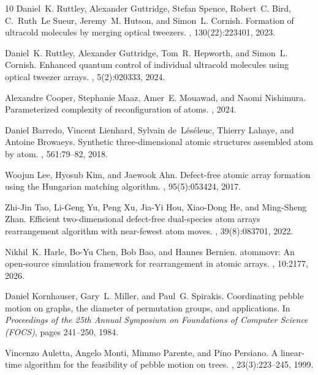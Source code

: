 \documentclass[a4paper,USenglish,thm-restate]{lipics-v2021}
\theoremstyle{problemstyle}
\begin{document}
\begin{thebibliography}{10}
Daniel~K. Ruttley, Alexander Guttridge, Stefan Spence, Robert~C. Bird,
  C.~Ruth~Le Sueur, Jeremy~M. Hutson, and Simon~L. Cornish.
\newblock Formation of ultracold molecules by merging optical tweezers.
, 130(22):223401, 2023.

Daniel~K. Ruttley, Alexander Guttridge, Tom~R. Hepworth, and Simon~L. Cornish.
\newblock Enhanced quantum control of individual ultracold molecules using
  optical tweezer arrays.
, 5(2):020333, 2024.

Alexandre Cooper, Stephanie Maaz, Amer~E. Mouawad, and Naomi Nishimura.
\newblock Parameterized complexity of reconfiguration of atoms.
, 2024.

Daniel Barredo, Vincent Lienhard, Sylvain de~L{\'e}s{\'e}leuc, Thierry Lahaye,
  and Antoine Browaeys.
\newblock Synthetic three-dimensional atomic structures assembled atom by atom.
, 561:79--82, 2018.

Woojun Lee, Hyosub Kim, and Jaewook Ahn.
\newblock Defect-free atomic array formation using the {Hungarian} matching
  algorithm.
, 95(5):053424, 2017.

Zhi-Jin Tao, Li-Geng Yu, Peng Xu, Jia-Yi Hou, Xiao-Dong He, and Ming-Sheng
  Zhan.
\newblock Efficient two-dimensional defect-free dual-species atom arrays
  rearrangement algorithm with near-fewest atom moves.
, 39(8):083701, 2022.

Nikhil~K. Harle, Bo-Yu Chen, Bob Bao, and Hannes Bernien.
\newblock atommovr: An open-source simulation framework for rearrangement in
  atomic arrays.
, 10:2177, 2026.

Daniel Kornhauser, Gary~L. Miller, and Paul~G. Spirakis.
\newblock Coordinating pebble motion on graphs, the diameter of permutation
  groups, and applications.
\newblock In {\em Proceedings of the 25th Annual Symposium on Foundations of
  Computer Science (FOCS)}, pages 241--250, 1984.

Vincenzo Auletta, Angelo Monti, Mimmo Parente, and Pino Persiano.
\newblock A linear-time algorithm for the feasibility of pebble motion on
  trees.
, 23(3):223--245, 1999.


\end{thebibliography}
\end{document}

